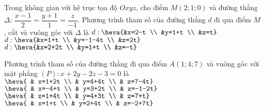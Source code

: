 \begin{ex}%
	Trong không gian với hệ trục tọa độ $Oxyz$, cho điểm $M(2;1;0)$ và đường thẳng $\Delta$: $\dfrac{x-1}{2}=\dfrac{y+1}{1}=\dfrac{z}{-1}$. Phương trình tham số của đường thẳng $d$ đi qua điểm $M$, cắt và vuông góc với $\Delta$ là
	{$d: \heva{&x=2-t \\ &y=1+t \\ &z=t}$}
	{$d: \heva{&x=1+t \\ &y=-1-4t \\ &z=2t}$}
	{$d: \heva{&x=2+2t \\ &y=1+t \\ &z=-t}$} 
\end{ex}
\begin{ex}%
	Phương trình tham số của đường thẳng đi qua điểm $A\left(1;4;7\right)$ và vuông góc với mặt phẳng $(P)\colon x+2y-2z-3=0$ là
	\choice
	{\True $\heva{
	& x=1+2t \\ 
	& y=4+4t \\ 
	& z=7-4t}$}
	{$\heva{
	& x=-4+t \\ 
	& y=3+2t \\ 
	& z=-1-2t}$}
	{$\heva{
	& x=1+4t \\ 
	& y=4+3t \\ 
	& z=7+t}$}
	{$\heva{
	& x=1+t \\ 
	& y=2+4t \\ 
	& z=-2+7t}$}
\end{ex}
